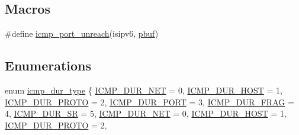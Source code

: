 \subsection*{Macros}
\begin{DoxyCompactItemize}
\item 
\#define \hyperlink{openmote-cc2538_2lwip_2src_2include_2lwip_2icmp_8h_a8d52f47a3b8237697544280c22f2925e}{icmp\+\_\+port\+\_\+unreach}(isipv6,  \hyperlink{structpbuf}{pbuf})
\end{DoxyCompactItemize}
\subsection*{Enumerations}
\begin{DoxyCompactItemize}
\item 
enum \hyperlink{openmote-cc2538_2lwip_2src_2include_2lwip_2icmp_8h_a17637465f209385e5d19ef47fd9266a5}{icmp\+\_\+dur\+\_\+type} \{ \newline
\hyperlink{native_2lwip_2src_2include_2lwip_2icmp_8h_a17637465f209385e5d19ef47fd9266a5a3cc3714544e123bdef2eadb1a4d320e3}{I\+C\+M\+P\+\_\+\+D\+U\+R\+\_\+\+N\+ET} = 0, 
\hyperlink{native_2lwip_2src_2include_2lwip_2icmp_8h_a17637465f209385e5d19ef47fd9266a5a648ab915a76dfb7b9568e94de00da1e7}{I\+C\+M\+P\+\_\+\+D\+U\+R\+\_\+\+H\+O\+ST} = 1, 
\hyperlink{native_2lwip_2src_2include_2lwip_2icmp_8h_a17637465f209385e5d19ef47fd9266a5a3c7bbd13b613990413ef167017dfbcef}{I\+C\+M\+P\+\_\+\+D\+U\+R\+\_\+\+P\+R\+O\+TO} = 2, 
\hyperlink{native_2lwip_2src_2include_2lwip_2icmp_8h_a17637465f209385e5d19ef47fd9266a5ac973dd9b04e094043ccc4cf875ef5644}{I\+C\+M\+P\+\_\+\+D\+U\+R\+\_\+\+P\+O\+RT} = 3, 
\newline
\hyperlink{native_2lwip_2src_2include_2lwip_2icmp_8h_a17637465f209385e5d19ef47fd9266a5a8be2bc49d42aa1a6ee1da93a8700ef5f}{I\+C\+M\+P\+\_\+\+D\+U\+R\+\_\+\+F\+R\+AG} = 4, 
\hyperlink{native_2lwip_2src_2include_2lwip_2icmp_8h_a17637465f209385e5d19ef47fd9266a5af63296fc25f79e56946a56a8da132c13}{I\+C\+M\+P\+\_\+\+D\+U\+R\+\_\+\+SR} = 5, 
\hyperlink{openmote-cc2538_2lwip_2src_2include_2lwip_2icmp_8h_a17637465f209385e5d19ef47fd9266a5a3cc3714544e123bdef2eadb1a4d320e3}{I\+C\+M\+P\+\_\+\+D\+U\+R\+\_\+\+N\+ET} = 0, 
\hyperlink{openmote-cc2538_2lwip_2src_2include_2lwip_2icmp_8h_a17637465f209385e5d19ef47fd9266a5a648ab915a76dfb7b9568e94de00da1e7}{I\+C\+M\+P\+\_\+\+D\+U\+R\+\_\+\+H\+O\+ST} = 1, 
\newline
\hyperlink{openmote-cc2538_2lwip_2src_2include_2lwip_2icmp_8h_a17637465f209385e5d19ef47fd9266a5a3c7bbd13b613990413ef167017dfbcef}{I\+C\+M\+P\+\_\+\+D\+U\+R\+\_\+\+P\+R\+O\+TO} = 2, 

\end{DoxyCompactItemize}
